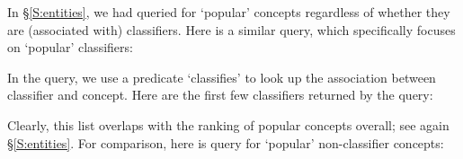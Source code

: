 In \S\ref{S:entities}, we had queried for `popular' concepts regardless of whether they are (associated with) classifiers. Here is a similar query, which specifically focuses on `popular' classifiers:


\noindent
In the query, we use a predicate `classifies' to look up the association between classifier and concept. Here are the first few classifiers returned by the query:


\noindent
Clearly, this list overlaps with the ranking of popular concepts overall; see again \S\ref{S:entities}. For comparison, here is query for `popular' non-classifier concepts:







